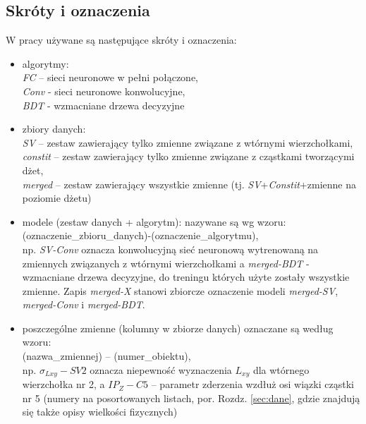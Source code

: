 \begin{appendices}
\section{Skróty i oznaczenia}
\label{sec:app:skroty}
W pracy używane są następujące skróty i oznaczenia: 
\begin{itemize}
	\item algorytmy: \\ \textit{FC} -- sieci neuronowe w pełni połączone,\\ \textit{Conv} - sieci neuronowe konwolucyjne,\\ \textit{BDT} - wzmacniane drzewa decyzyjne
	\item zbiory danych: \\ \textit{SV} -- zestaw zawierający tylko zmienne związane z wtórnymi wierzchołkami,\\ \textit{constit} -- zestaw zawierający tylko zmienne związane z cząstkami tworzącymi dżet,\\ \textit{merged} -- zestaw zawierający wszystkie zmienne (tj. \textit{SV}+\textit{Constit}+zmienne na poziomie dżetu)
	\item modele (zestaw danych + algorytm): nazywane są wg wzoru: \\ (oznaczenie\_zbioru\_danych)-(oznaczenie\_algorytmu), \\np. \textit{SV-Conv} oznacza konwolucyjną sieć neuronową wytrenowaną na zmiennych związanych z wtórnymi wierzchołkami a \textit{merged-BDT} - wzmacniane drzewa decyzyjne, do treningu których użyte zostały wszystkie zmienne. Zapis \textit{merged-X} stanowi zbiorcze oznaczenie modeli \textit{merged-SV}, \textit{merged-Conv} i \textit{merged-BDT}.
	\item poszczególne zmienne (kolumny w zbiorze danych) oznaczane są według wzoru: \\ (nazwa\_zmiennej) -- (numer\_obiektu), \\np. $\sigma_{Lxy} - SV2$ oznacza niepewność wyznaczenia $L_{xy}$ dla wtórnego wierzchołka nr 2, a $IP_Z - C5$ -- parametr zderzenia wzdłuż osi wiązki cząstki nr 5 (numery na posortowanych listach, por. Rozdz. \ref{sec:dane}, gdzie znajdują się także opisy wielkości fizycznych)
\end{itemize} 


\end{appendices}
